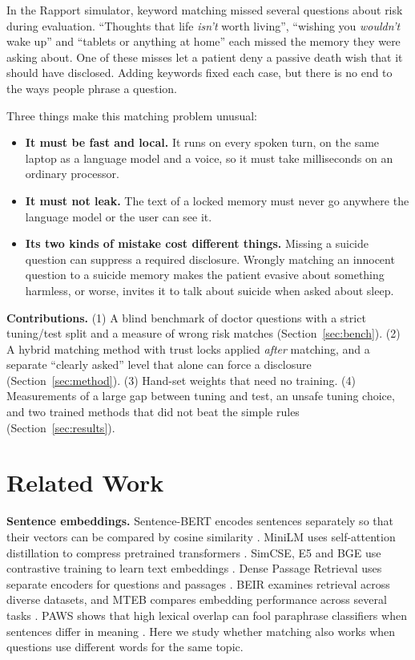 \documentclass[journal]{IEEEtran}
\begin{document}
In the Rapport simulator, keyword matching missed several questions about risk during evaluation. ``Thoughts that life \emph{isn't} worth living'',
``wishing you \emph{wouldn't} wake up'' and ``tablets or anything at home'' each missed the memory they were asking about. One of these misses
let a patient deny a passive death wish that it should have disclosed. Adding keywords fixed each case, but there is no end to the ways people
phrase a question.

Three things make this matching problem unusual:
\begin{itemize}
\item \textbf{It must be fast and local.} It runs on every spoken turn, on the same laptop as a language model and a voice, so it must take
milliseconds on an ordinary processor.
\item \textbf{It must not leak.} The text of a locked memory must never go anywhere the language model or the user can see it.
\item \textbf{Its two kinds of mistake cost different things.} Missing a suicide question can suppress a required disclosure. Wrongly matching
an innocent question to a suicide memory makes the patient evasive about something harmless, or worse, invites it to talk about suicide when asked
about sleep.
\end{itemize}

\textbf{Contributions.} (1) A blind benchmark of doctor questions with a strict tuning/test split and a measure of wrong risk matches
(Section~\ref{sec:bench}). (2) A hybrid matching method with trust locks applied \emph{after} matching, and a separate ``clearly asked'' level
that alone can force a disclosure (Section~\ref{sec:method}). (3) Hand-set weights that need no training. (4) Measurements of a large gap between
tuning and test, an unsafe tuning choice, and two trained methods that did not beat the simple rules (Section~\ref{sec:results}).

\section{Related Work}
\textbf{Sentence embeddings.} Sentence-BERT encodes sentences separately so that their vectors can be compared by cosine similarity
\cite{reimers2019sentencebert}. MiniLM uses self-attention distillation to compress pretrained transformers \cite{wang2020minilm}.
SimCSE, E5 and BGE use contrastive training to learn text embeddings \cite{gao2021simcse,wang2022e5,xiao2023cpack}.
Dense Passage Retrieval uses separate encoders for questions and passages \cite{karpukhin2020dpr}. BEIR examines retrieval across diverse datasets,
and MTEB compares embedding performance across several tasks \cite{thakur2021beir,muennighoff2022mteb}. PAWS shows that high lexical overlap can
fool paraphrase classifiers when sentences differ in meaning \cite{zhang2019paws}. Here we study whether matching also works when questions
use different words for the same topic.
\end{document}
